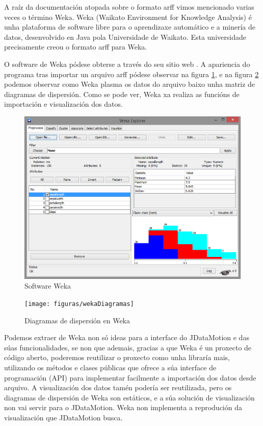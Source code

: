 
A raíz da documentación atopada sobre o formato arff vimos mencionado varias veces o término Weka. Weka (Waikato Environment for Knowledge Analysis) é unha plataforma de software libre para o aprendizaxe automático e a minería de datos, desenvolvido en Java pola Universidade de Waikato. Esta universidade precisamente creou o formato arff para Weka.

O software de Weka pódese obterse a través do seu sitio web \cite{weka}. A apariencia do programa tras importar un arquivo arff pódese observar na figura \ref{weka}, e na figura \ref{wekaDiagramas} podemos observar como Weka plasma os datos do arquivo baixo unha matriz de diagramas de dispersión. Como se pode ver, Weka xa realiza as funcións de importación e visualización dos datos.

\begin{figure}
\centering
\includegraphics[width=\textwidth,height=\textheight,keepaspectratio]{figuras/weka}
\caption{Software Weka}
\label{weka}
\end{figure}

\begin{figure}
\centering
\texttt{[image: figuras/wekaDiagramas]}
\caption{Diagramas de dispersión en Weka}
\label{wekaDiagramas}
\end{figure}

Podemos extraer de Weka non só ideas para a interface do JDataMotion e das súas funcionalidades, se non que ademais, gracias a que Weka é un proxecto de código aberto, poderemos reutilizar o proxecto como unha libraría mais, utilizando os métodos e clases públicas que ofrece a súa interface de programación (API) para implementar facilmente a importación dos datos desde arquivo. A visualización dos datos tamén podería ser reutilizada, pero os diagramas de dispersión de Weka son estáticos, e a súa solución de visualización non vai servir para o JDataMotion. Weka non implementa a reprodución da visualización que JDataMotion busca.

